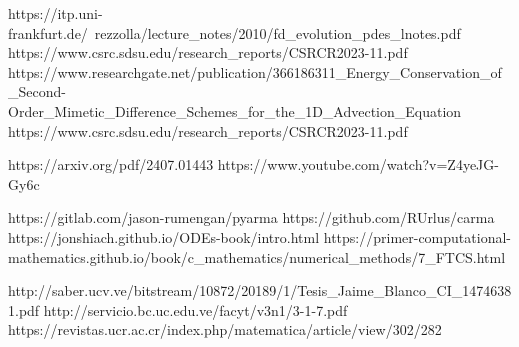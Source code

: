 



\frame{\maketitle}





https://itp.uni-frankfurt.de/~rezzolla/lecture_notes/2010/fd_evolution_pdes_lnotes.pdf
https://www.csrc.sdsu.edu/research_reports/CSRCR2023-11.pdf
https://www.researchgate.net/publication/366186311_Energy_Conservation_of_Second-Order_Mimetic_Difference_Schemes_for_the_1D_Advection_Equation
https://www.csrc.sdsu.edu/research_reports/CSRCR2023-11.pdf

https://arxiv.org/pdf/2407.01443
https://www.youtube.com/watch?v=Z4yeJG-Gy6c

https://gitlab.com/jason-rumengan/pyarma
https://github.com/RUrlus/carma
https://jonshiach.github.io/ODEs-book/intro.html
https://primer-computational-mathematics.github.io/book/c_mathematics/numerical_methods/7_FTCS.html

http://saber.ucv.ve/bitstream/10872/20189/1/Tesis_Jaime_Blanco_CI_14746381.pdf
http://servicio.bc.uc.edu.ve/facyt/v3n1/3-1-7.pdf
https://revistas.ucr.ac.cr/index.php/matematica/article/view/302/282
